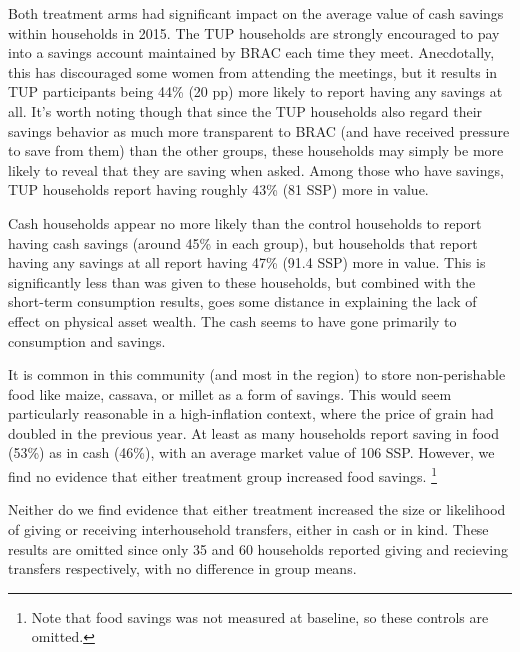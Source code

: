 \documentclass[12pt,article]{article}
\begin{document}
Both treatment arms had significant impact on the average value of cash savings
within households in 2015. The TUP households are strongly encouraged to pay into a savings
account maintained by BRAC each time they meet. Anecdotally, this has discouraged
some women from attending the meetings, but it results in TUP participants being 44\%
(20 pp) more likely to report having any savings at all. It's
worth noting though that since the TUP households also regard their savings behavior
as much more transparent to BRAC (and have received pressure to save from them) than
the other groups, these households may simply be more likely to reveal that they are
saving when asked. Among those who have savings, TUP households report having roughly
43\% (81 SSP) more in value.

Cash households appear no more likely than the control households to report having
cash savings (around 45\% in each group), but households that report having any
savings at all report
having 47\% (91.4 SSP) more in value. This is significantly less than was given to
these households, but combined with the short-term consumption results, goes some
distance in explaining the lack of effect on physical asset wealth. The cash seems to
have gone primarily to consumption and savings.

It is common in this community (and most in the region) to store non-perishable food
like maize, cassava, or millet as a form of savings. This would seem particularly
reasonable in a high-inflation context, where the price of grain had doubled in the
previous year. At least as many households report saving in food (53\%) as in cash
(46\%), with an average market value of 106 SSP. However, we find no evidence that
either treatment group increased food savings. \footnote{Note that food savings was not
measured at baseline, so these controls are omitted.}

Neither do we find evidence that either treatment increased the size or likelihood of
giving or receiving interhousehold transfers, either in cash or in kind. These
results are omitted since only 35 and 60 households reported giving and recieving
transfers respectively, with no difference in group means.
\end{document}
